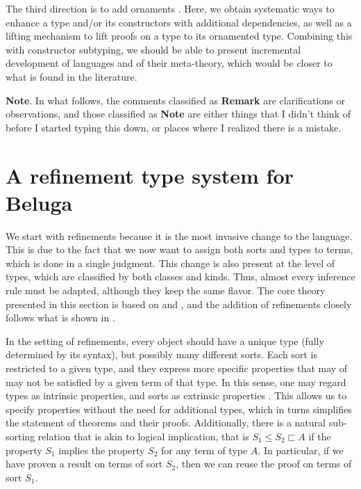 \documentclass[letterpaper, 11pt]{article}
\begin{document}
    The third direction is to add ornaments \cite{McBride2011}.  Here, we obtain systematic ways to enhance a type and/or its constructors with 
    additional dependencies, as well as a lifting mechanism to lift proofs on a type to its ornamented type.  Combining this with constructor subtyping,
    we should be able to present incremental development of languages and of their meta-theory, which would be closer to what is found in the literature.

    \textbf{Note}. In what follows, the comments classified as \textbf{Remark} are clarifications or observations, and those classified as \textbf{Note} 
    are either things that I didn't think of before I started typing this down, or places where I realized there is a mistake.


    \section{A refinement type system for Beluga}
    
    We start with refinements because it is the most invasive change to the language.  This is due to the fact that we now want to assign both sorts
    and types to terms, which is done in a single judgment.  This change is also present at the level of types, which are classified by both classes
    and kinds.  Thus, almost every inference rule must be adapted, although they keep the same flavor.  The core theory presented in this section is
    based on \cite{Pientka2008} and \cite{PientkaDunfield2008}, and the addition of refinements closely follows what is shown in \cite{LovasPfenning2010}.

    In the setting of refinements, every object should have a unique type (fully determined by its syntax), but possibly many different sorts.  Each 
    sort is restricted to a given type, and they express more specific properties that may of may not be satisfied by a given term of that type.  In 
    this sense, one may regard types as intrinsic properties, and sorts as extrinsic properties \cite{Pfenning2000}.  This allows us to specify properties
    without the need for additional types, which in turns simplifies the statement of theorems and their proofs.  Additionally, there is a natural 
    sub-sorting relation that is akin to logical implication, that is $S_1 \leq S_2 \sqsubset A$ if the property $S_1$ implies the property $S_2$ for
    any term of type $A$.  In particular, if we have proven a result on terms of sort $S_2$, then we can reuse the proof on terms of sort $S_1$.
\end{document}
